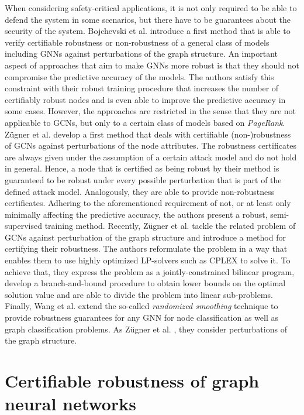 \documentclass[a4paper,preprint]{sig-alternate}
\begin{document}
When considering safety-critical applications, it is not only required to be able to defend the system in some scenarios, but there
have to be guarantees about the security of the system.
Bojchevski et al. \cite{bojchevski2019certifiable} introduce a first method that is able to verify certifiable robustness or
non-robustness of a general class of models including GNNs against perturbations of the graph structure.
An important aspect of approaches that aim to make GNNs more robust is that they should not compromise the predictive accuracy of the models.
The authors satisfy this constraint with their robust training procedure that increases the number of certifiably robust nodes
and is even able to improve the predictive accuracy in some cases.
However, the approaches are restricted in the sense that they are not applicable to GCNs, but only to a certain class of models
based on \textit{PageRank}. \cite{10.1145/3394486.3403217}
Zügner et al. \cite{Zuegner_2019} develop a first method that deals with certifiable (non-)robustness of GCNs against perturbations
of the node attributes. The robustness certificates are always given under the assumption of a certain attack model and do not hold in general.
Hence, a node that is certified as being robust by their method is guaranteed to be robust under every possible perturbation that is part of the
defined attack model. Analogously, they are able to provide non-robustness certificates.
Adhering to the aforementioned requirement of not, or at least only minimally affecting the predictive accuracy,
the authors present a robust, semi-supervised training method.
Recently, Zügner et al. \cite{10.1145/3394486.3403217} tackle the related problem of GCNs against perturbation of the graph structure
and introduce a method for certifying their robustness. The authors reformulate the problem in a way that enables them to use highly 
optimized LP-solvers such as CPLEX to solve it. To achieve that, they express the problem as a jointly-constrained bilinear program, 
develop a branch-and-bound procedure to obtain lower bounds on the optimal solution value and are able to divide the problem into linear 
sub-problems.
Finally, Wang et al.\cite{Wang_2020} extend the so-called \textit{randomized smoothing} technique to provide robustness guarantees for any
GNN for node classification as well as graph classification problems. As Zügner et al. \cite{10.1145/3394486.3403217}, they consider
perturbations of the graph structure.

\section{Certifiable robustness of graph neural networks}
\label{sec:main_section}
\end{document}
